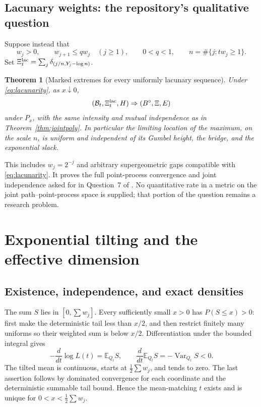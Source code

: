 \documentclass[11pt,a4paper]{article}
\numberwithin{equation}{section}
\newtheorem{theorem}{Theorem}[section]
\theoremstyle{definition}
\theoremstyle{remark}
\newcommand{\E}{\mathbb E}
\newcommand{\Var}{\operatorname{Var}}
\begin{document}
\subsection{Lacunary weights: the repository's qualitative question}
Suppose instead that
\begin{equation}
 w_j>0,\qquad w_{j+1}\le q w_j\quad(j\ge1),\qquad 0<q<1,
 \qquad n=\#\{j:tw_j\ge1\}. \label{eq:lacunarity}
\end{equation}
Set $\Xi_t^{\rm lac}=\sum_j\delta_{(j/n,Y_j-\log n)}$.

\begin{theorem}[Marked extremes for every uniformly lacunary sequence]
\label{thm:lacunary}
Under \eqref{eq:lacunarity}, as $x\downarrow0$,
\begin{equation}
 (\mathcal B_t,\Xi_t^{\rm lac},H)
       \Rightarrow(B^\circ,\Xi,E)
 \label{eq:lacjoint}
\end{equation}
under $P_x$, with the same intensity and mutual independence as in
Theorem~\ref{thm:jointpoly}. In particular the limiting location of the
maximum, on the scale $n$, is uniform and independent of its Gumbel
height, the bridge, and the exponential slack.
\end{theorem}
This includes $w_j=2^{-j}$ and arbitrary supergeometric gaps compatible
with \eqref{eq:lacunarity}. It proves the full point-process convergence
and joint independence asked for in Question~7 of \cite{repolac}.
No quantitative rate in a metric on the joint path--point-process space
is supplied; that portion of the question remains a research problem.

\section{Exponential tilting and the effective dimension}
\label{sec:tilt}

\subsection{Existence, independence, and exact densities}
The sum $S$ lies in $[0,\sum w_j]$. Every sufficiently small $x>0$ has
$P(S\le x)>0$: first make the deterministic tail less than $x/2$, and
then restrict finitely many uniforms so their weighted sum is below
$x/2$. Differentiation under the bounded integral gives
\[
 -\frac{d}{dt}\log L(t)=\E_{Q_t}S,\qquad
 \frac{d}{dt}\E_{Q_t}S=-\Var_{Q_t}S<0.
\]
The tilted mean is continuous, starts at $\frac12\sum w_j$, and tends
to zero. The last assertion follows by dominated convergence for each
coordinate and the deterministic summable tail bound. Hence the
mean-matching $t$ exists and is unique for
$0<x<\frac12\sum w_j$.
\end{document}
